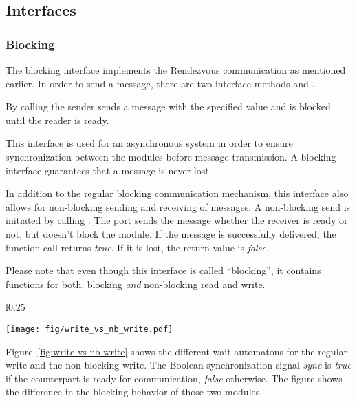 \subsection{Interfaces}
\label{section:interfaces}

\subsubsection{Blocking}

The blocking interface implements the Rendezvous communication as
mentioned earlier. %
In order to send a message, there are two interface methods
 and . %

By calling  the sender sends a
message with the specified value and is blocked until the reader is
ready. %

This interface is used for an asynchronous system in order to ensure
synchronization between the modules before message transmission. %
A blocking interface guarantees that a message is never lost. %


In addition to the regular blocking communication mechanism, this 
  interface also allows for non-blocking sending and receiving of
  messages. %
  A non-blocking send is initiated by calling
  . %
  The port sends the message whether the receiver is ready or not, but
  doesn't block the module. %
  If the message is successfully delivered, the function call returns
  \textit{true}. %
  If it is lost, the return value is \textit{false}. %

  Please note that even though this interface is called ``blocking'',
  it contains functions for both, blocking \emph{and} non-blocking
  read and write. %

\begin{wrapfigure}{l}{0.25\textwidth}
  \vspace{-20pt}
    \caption{Transitions for write and nb\_write}
    \label{fig:write-vs-nb-write}
    \texttt{[image: fig/write\_vs\_nb\_write.pdf]}
     \vspace{-40pt}
\end{wrapfigure}

Figure~\ref{fig:write-vs-nb-write} shows the different wait automatons for the regular write and the non-blocking write. %
The Boolean synchronization signal \textit{sync} is \textit{true} 
if the counterpart is ready for communication, \textit{false} otherwise. %
The figure shows the difference in the blocking behavior of those two modules. %

